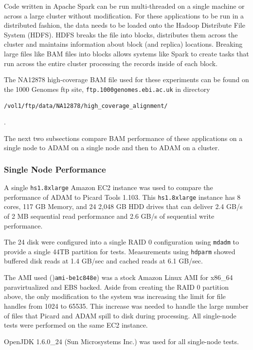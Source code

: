 \documentclass[10pt,twocolumn]{article}
\theoremstyle{plain}
\begin{document}
Code written in Apache Spark can be run multi-threaded on a single machine or across a large cluster without modification.
For these applications to be run in a distributed fashion, the data needs to be loaded onto the Hadoop
Distribute File System (HDFS). HDFS breaks the file into blocks, distributes them across the cluster and maintains
information about block (and replica) locations. Breaking large files like BAM files into blocks allows systems
like Spark to create tasks that run across the entire cluster processing the records inside of each block. 

The NA12878 high-coverage BAM file used for these experiments can be found on the 1000 Genomes ftp site, 
\texttt{ftp.1000genomes.ebi.ac.uk} in directory \begin{small}\texttt{/vol1/ftp/data/NA12878/high\_coverage\_alignment/}\end{small}.

The next two subsections compare BAM performance of these applications on a single node to ADAM on a single node and then to ADAM on a cluster.

\subsubsection{Single Node Performance}

A single \texttt{hs1.8xlarge} Amazon EC2 instance was used to compare the performance of ADAM to Picard Tools 1.103.
This \texttt{hs1.8xlarge} instance has 8 cores, 117 GB Memory, and 24 2,048 GB HDD drives that can
deliver 2.4 GB/s of 2 MB sequential read performance and 2.6 GB/s of sequential write performance. 

The 24 disk were configured into a single RAID 0 configuration using \texttt{mdadm} to provide a single 44TB partition for tests.
Measurements using \texttt{hdparm} showed buffered disk reads at 1.4 GB/sec and cached reads at 6.1 GB/sec.

The AMI used ()\texttt{ami-be1c848e}) was a stock Amazon Linux AMI for x86\_64 paravirtualized and EBS backed. Aside
from creating the RAID 0 partition above, the only modification to the system was increasing the limit for file
handles from 1024 to 65535. This increase was needed to handle the large number of files that Picard and ADAM spill to disk during
processing. All single-node tests were performed on the same EC2 instance.

OpenJDK 1.6.0\_24 (Sun Microsystems Inc.) was used for all single-node tests.
\end{document}
